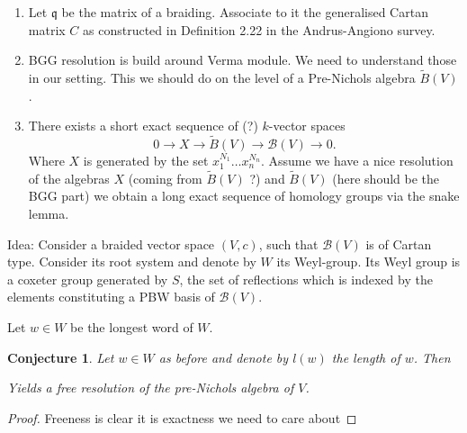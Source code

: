 \documentclass{amsart}
\newtheorem*{conjecture}{Conjecture}
\theoremstyle{definition}
\newcommand{\Nichols}[1]{\ensuremath{\mathcal{B}(#1)}}
\begin{document}
	
	\begin{enumerate}
		\item Let $\mathfrak q$ be the matrix of a braiding. Associate to it the generalised Cartan matrix $C$ as constructed in Definition 2.22 in the Andrus-Angiono survey.
		\item BGG resolution is build around Verma module. We need to understand those in our setting. This we should do on the level of a Pre-Nichols algebra $\tilde B(V)$.
		\item There exists a short exact sequence of (?) $k$-vector spaces
		$$
			0 \rightarrow X \rightarrow \tilde B(V) \rightarrow \Nichols V \rightarrow 0.
		$$
		Where $X$ is generated by the set $x_1^{N_1} \dotsc x_n^{N_n}$.
		Assume we have a nice resolution of the algebras $X$ (coming from $\tilde B(V)$ ?) and $\tilde B(V)$ (here should be the BGG part) we obtain a long exact sequence of homology groups via the snake lemma.
	\end{enumerate}



	Idea: Consider a braided vector space $(V,c)$, such that $\Nichols V$ is of Cartan type.
	Consider its root system and denote by $W$ its Weyl-group. Its Weyl group is a coxeter group generated by $S$, the set of reflections which is indexed by the elements constituting a PBW basis of $\Nichols V$.
	
	Let $w\in W$ be the longest word of $W$.
		
	\begin{conjecture}
		Let $w\in W$ as before and denote by $l(w)$ the length of $w$. 
		Then
		\begin{center}
		\end{center}
	Yields a free resolution of the pre-Nichols algebra of $V$.
	\end{conjecture}
	\begin{proof}
		Freeness is clear it is exactness we need to care about
		
	\end{proof}
\end{document}
